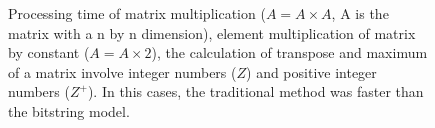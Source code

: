 \documentclass[10pt]{article}
\begin{document}
\begin{figure}[h]
{  }
  \caption{Processing time of matrix multiplication ($A = A \times A$, A is the matrix with a n by n dimension), 
  element multiplication of matrix by constant ($A=A \times 2$), the calculation of transpose and maximum of a 
  matrix involve integer numbers ($Z$) and positive integer numbers ($Z^+$). In this cases, the traditional 
  method was faster than the bitstring model.}
  \label{fig:27282930}
\end{figure}
\end{document}
